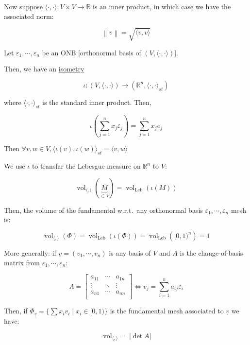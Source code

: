 \documentclass[openany]{amsbook}
\numberwithin{section}{chapter}
\theoremstyle{definition}
\begin{document}
Now suppose \(\langle \cdot , \cdot \rangle : V \times V \to \mathbb{R}\) is an inner product, in which case we have the associated norm:

\[
    \left\lVert v \right\rVert = \sqrt{\langle v, v \rangle } 
\]

Let \(\varepsilon_1, \cdots , \varepsilon_n\) be an ONB [orthonormal basis of \((V, \langle\cdot,\cdot\rangle )\)].

Then, we have an \underline{isometry}

\[
    \iota : (V, \langle \cdot,\cdot \rangle) \to (\mathbb{R}^n, \langle \cdot,\cdot \rangle_{st})
\]

where \(\langle \cdot,\cdot \rangle_{st}\) is the standard inner product. Then,

\[
    \iota \left( \sum_{j=1}^{n} x_j \varepsilon _ j  \right)  = \sum_{j=1}^{n} x_j e_j
\]

Then \(\forall v, w \in V, \langle \iota (v), \iota (w) \rangle_{st} = \langle v, w \rangle \) 

We use \(\iota\) to transfar the Lebesgue measure on \(\mathbb{R}^n\) to \(V\):

\[
    \operatorname{vol}_{\langle , \rangle}(\underbrace{M}_{\subset V}) = \operatorname{vol}_{\operatorname{Leb}} (\iota (M))
\]

Then, the volume of the fundamental w.r.t.\ any orthonormal basis \(\varepsilon_1, \cdots , \varepsilon_n\) mesh is:

\[
    \operatorname{vol}_{\langle , \rangle} (\Phi) = \operatorname{vol}_{\operatorname{Leb}}(\iota(\Phi)) = \operatorname{vol}_{\operatorname{Leb}} \left([0,1)^n\right) = 1
\]

More generally: if \(\underline{v} = (v_1, \cdots , v_n)\) is any basis of \(V\) and \(A\) is the change-of-basis matrix from \(\varepsilon_1 , \cdots , \varepsilon_n\):

\[
    A = \begin{bmatrix}
        a_{11} & \cdots  &  a_{1n} \\
        \vdots & \ddots &  \vdots \\
        a_{n1} & \cdots &  a_{nn} \\
    \end{bmatrix} \iff v_j = \sum_{i=1}^{n} a_{ij} \varepsilon_i
\]

Then, if \(\Phi_{\underline{v}} = \{ \sum x_i v_i \mid x_i\in [0,1) \} \) is the fundamental mesh associated to \(\underline{v}\) we have:

\[
    \boxed{\operatorname{vol}_{\langle , \rangle} = \vert \det A \vert}
\]
\end{document}
